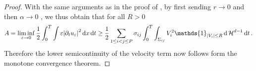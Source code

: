\begin{proof}
	With the same arguments as in the proof of 
	, by first sending $ r \to 0 $ and then 
	$ \alpha \to 0$ , we thus obtain that for all $R > 0 $
	\begin{equation*}
		A = \liminf_{ \varepsilon \to 0 } \frac{ 1 }{ 2 }
		\int_{ 0 }^{ T }
			\int
				\varepsilon \abs{ \partial_{ t } u_{ \varepsilon } }^{ 2 }
			\dd{ x }
		\dd{ t }
		\geq
		\frac{ 1 }{ 2 }
		\sum_{ 1 \leq i < j \leq P }
			\sigma_{ i j }
			\int_{ 0 }^{ T }
				\int_{ \Sigma_{ i j } }
					V_{ i }^{ 2 }
					\mathds{ 1 }_{ \abs{ V_{ i } } \leq R }
				\dd{ \hm^{ d - 1 } }
			\dd{ t }.
	\end{equation*}
	Therefore the lower semicontinuity of the velocity term now follows form 
	the 
	monotone convergence theorem.
\end{proof}

